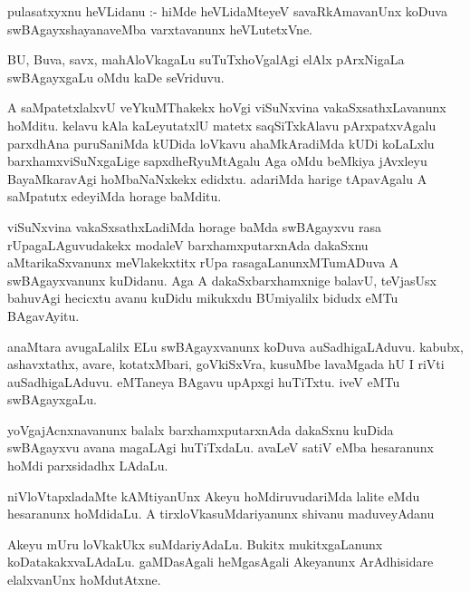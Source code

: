 \documentclass{article}
\begin{document}
\begin{mn}
pulasatxyxnu  heVLidanu :- hiMde  heVLidaMteyeV  savaRkAmavanUnx  koDuva  swBAgayxshayanaveMba  
varxtavanunx  heVLutetxVne.
\end{mn}

\begin{mn}
BU,  Buva,  savx,  mahAloVkagaLu  suTuTxhoVgalAgi  elAlx  pArxNigaLa  swBAgayxgaLu  oMdu  kaDe  seVriduvu.
\end{mn}

\begin{mn}
A  saMpatetxlalxvU  veYkuMThakekx  hoVgi  viSuNxvina  vakaSxsathxLavanunx  hoMditu.  kelavu  kAla  
kaLeyutatxlU  matetx  saqSiTxkAlavu  pArxpatxvAgalu  parxdhAna  puruSaniMda  kUDida  loVkavu  
ahaMkAradiMda  kUDi koLaLxlu  barxhamxviSuNxgaLige  sapxdheRyuMtAgalu  Aga  oMdu  beMkiya  jAvxleyu  
BayaMkaravAgi  hoMbaNaNxkekx  edidxtu.  adariMda  harige  tApavAgalu  A  saMpatutx  edeyiMda  horage  baMditu.
\end{mn}

\begin{mn}
viSuNxvina  vakaSxsathxLadiMda  horage  baMda  swBAgayxvu  rasa  rUpagaLAguvudakekx  modaleV  barxhamxputarxnAda  
dakaSxnu  aMtarikaSxvanunx  meVlakekxtitx  rUpa  rasagaLanunxMTumADuva  A  swBAgayxvanunx  kuDidanu.  Aga  A  
dakaSxbarxhamxnige  balavU,  teVjasUsx  bahuvAgi  hecicxtu  avanu  kuDidu  mikukxdu  BUmiyalilx  bidudx  eMTu  BAgavAyitu.  
\end{mn}

\begin{mn}
anaMtara  avugaLalilx  ELu  swBAgayxvanunx  koDuva  auSadhigaLAduvu.  kabubx,  ashavxtathx,  avare,  
kotatxMbari,  goVkiSxVra,  kusuMbe  lavaMgada  hU  I riVti  auSadhigaLAduvu.  eMTaneya  BAgavu  
upApxgi  huTiTxtu.  iveV  eMTu  swBAgayxgaLu.
\end{mn}

\begin{mn}
yoVgajAcnxnavanunx  balalx  barxhamxputarxnAda  dakaSxnu  kuDida  swBAgayxvu  avana  magaLAgi  
huTiTxdaLu.  avaLeV  satiV  eMba  hesaranunx  hoMdi  parxsidadhx LAdaLu.
\end{mn}

\begin{mn}
niVloVtapxladaMte  kAMtiyanUnx  Akeyu  hoMdiruvudariMda  lalite  eMdu  hesaranunx  hoMdidaLu.  
A  tirxloVkasuMdariyanunx  shivanu  maduveyAdanu
\end{mn}

\begin{mn}
Akeyu  mUru  loVkakUkx  suMdariyAdaLu.  Bukitx  mukitxgaLanunx  koDatakakxvaLAdaLu.  gaMDasAgali  
heMgasAgali  Akeyanunx  ArAdhisidare  elalxvanUnx  hoMdutAtxne.
\end{mn}
\end{document}

